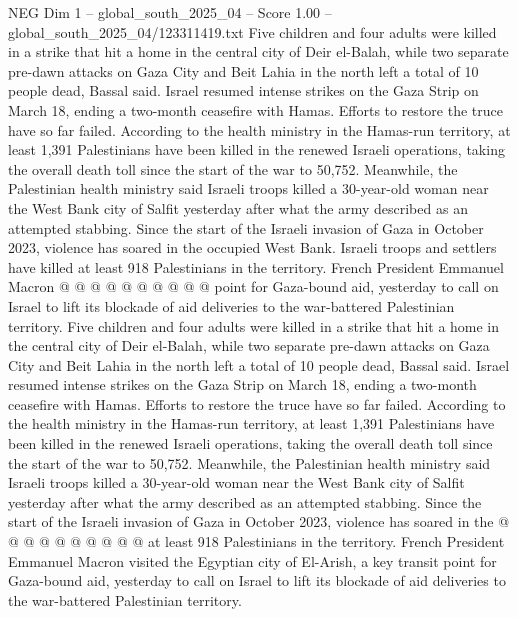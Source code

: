 \begin{textsample}{NEG Dim 1 – global\_south\_2025\_04 – Score 1.00 – global\_south\_2025\_04/123311419.txt}  \label{ex:f1_neg_134}
Five children and four adults were killed in a strike that hit a home in the central city of Deir el-Balah, while two separate pre-dawn attacks on Gaza City and Beit Lahia in the north left a total of 10 people dead, Bassal said.
Israel resumed intense strikes on the Gaza Strip on March 18, ending a two-month ceasefire with Hamas.
Efforts to restore the truce have so far failed.
According to the health ministry in the Hamas-run territory, at least 1,391 Palestinians have been killed in the renewed Israeli operations, taking the overall death toll since the start of the war to 50,752.
Meanwhile, the Palestinian health ministry said Israeli troops killed a 30-year-old woman near the West Bank city of Salfit yesterday after what the army described as an attempted stabbing.
Since the start of the Israeli invasion of Gaza in October 2023, violence has soared in the occupied West Bank.
Israeli troops and settlers have killed at least 918 Palestinians in the territory.
French President Emmanuel Macron @ @ @ @ @ @ @ @ @ @ point for Gaza-bound aid, yesterday to call on Israel to lift its blockade of aid deliveries to the war-battered Palestinian territory.
Five children and four adults were killed in a strike that hit a home in the central city of Deir el-Balah, while two separate pre-dawn attacks on Gaza City and Beit Lahia in the north left a total of 10 people dead, Bassal said.
Israel resumed intense strikes on the Gaza Strip on March 18, ending a two-month ceasefire with Hamas.
Efforts to restore the truce have so far failed.
According to the health ministry in the Hamas-run territory, at least 1,391 Palestinians have been killed in the renewed Israeli operations, taking the overall death toll since the start of the war to 50,752.
Meanwhile, the Palestinian health ministry said Israeli troops killed a 30-year-old woman near the West Bank city of Salfit yesterday after what the army described as an attempted stabbing.
Since the start of the Israeli invasion of Gaza in October 2023, violence has soared in the @ @ @ @ @ @ @ @ @ @ at least 918 Palestinians in the territory.
French President Emmanuel Macron visited the Egyptian city of El-Arish, a key transit point for Gaza-bound aid, yesterday to call on Israel to lift its blockade of aid deliveries to the war-battered Palestinian territory.

\end{textsample}
